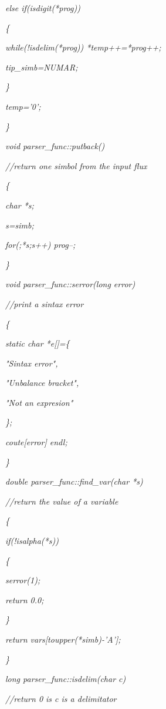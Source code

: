 \documentclass[a4paper,twoside]{book}
\begin{document}
\textit{\qquad else if(isdigit(*prog))}

\textit{\qquad \{}

\textit{\qquad \qquad while(!isdelim(*prog)) *temp++=*prog++;}

\textit{\qquad \qquad tip\_simb=NUMAR;}

\textit{\qquad \}}

\textit{\qquad *temp='\TEXTsymbol{\backslash}0';}

\textit{\}}

\textit{void parser\_func::putback()}

\textit{//return one simbol from the input flux}

\textit{\{}

\textit{\qquad char *s;}

\textit{\qquad s=simb;}

\textit{\qquad for(;*s;s++) prog--;}

\textit{\}}

\textit{void parser\_func::serror(long error)}

\textit{//print a sintax error}

\textit{\{}

\textit{\qquad static char *e[]=\{}

\textit{\qquad \qquad "Sintax error",}

\textit{\qquad \qquad "Unbalance bracket",}

\textit{\qquad \qquad "Not an expresion"}

\textit{\qquad \};}

\textit{\qquad cout\TEXTsymbol{<}\TEXTsymbol{<}e[error]\TEXTsymbol{<}%
\TEXTsymbol{<}endl;}

\textit{\}}

\textit{double parser\_func::find\_var(char *s)}

\textit{//return the value of a variable}

\textit{\{}

\textit{\qquad if(!isalpha(*s))}

\textit{\qquad \{}

\textit{\qquad \qquad serror(1);}

\textit{\qquad \qquad return 0.0;}

\textit{\qquad \}}

\textit{\qquad return vars[toupper(*simb)-'A'];}

\textit{\}}

\textit{long parser\_func::isdelim(char c)}

\textit{//return 0 is c is a delimitator}
\end{document}
